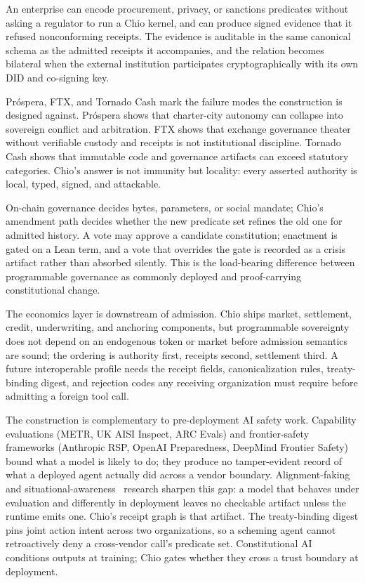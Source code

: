 An enterprise can encode procurement, privacy, or sanctions predicates without asking a regulator to run a Chio kernel, and can produce signed evidence that it refused nonconforming receipts. The evidence is auditable in the same canonical schema as the admitted receipts it accompanies, and the relation becomes bilateral when the external institution participates cryptographically with its own DID and co-signing key.

Próspera, FTX, and Tornado Cash mark the failure modes the construction is designed against. Próspera shows that charter-city autonomy can collapse into sovereign conflict and arbitration. FTX shows that exchange governance theater without verifiable custody and receipts is not institutional discipline. Tornado Cash shows that immutable code and governance artifacts can exceed statutory categories. Chio's answer is not immunity but locality: every asserted authority is local, typed, signed, and attackable.

On-chain governance decides bytes, parameters, or social mandate; Chio's amendment path decides whether the new predicate set refines the old one for admitted history. A vote may approve a candidate constitution; enactment is gated on a Lean term, and a vote that overrides the gate is recorded as a crisis artifact rather than absorbed silently. This is the load-bearing difference between programmable governance as commonly deployed and proof-carrying constitutional change.

The economics layer is downstream of admission. Chio ships market, settlement, credit, underwriting, and anchoring components, but programmable sovereignty does not depend on an endogenous token or market before admission semantics are sound; the ordering is authority first, receipts second, settlement third. A future interoperable profile needs the receipt fields, canonicalization rules, treaty-binding digest, and rejection codes any receiving organization must require before admitting a foreign tool call.

The construction is complementary to pre-deployment AI safety work. Capability evaluations (METR, UK AISI Inspect, ARC Evals) and frontier-safety frameworks (Anthropic RSP, OpenAI Preparedness, DeepMind Frontier Safety) bound what a model is likely to do; they produce no tamper-evident record of what a deployed agent actually did across a vendor boundary. Alignment-faking~\cite{hubingerAlignmentFaking2024} and situational-awareness~\cite{berglundSituationalAwareness2023} research sharpen this gap: a model that behaves under evaluation and differently in deployment leaves no checkable artifact unless the runtime emits one. Chio's receipt graph is that artifact. The treaty-binding digest pins joint action intent across two organizations, so a scheming agent cannot retroactively deny a cross-vendor call's predicate set. Constitutional AI~\cite{baiConstitutionalAI2022} conditions outputs at training; Chio gates whether they cross a trust boundary at deployment.

